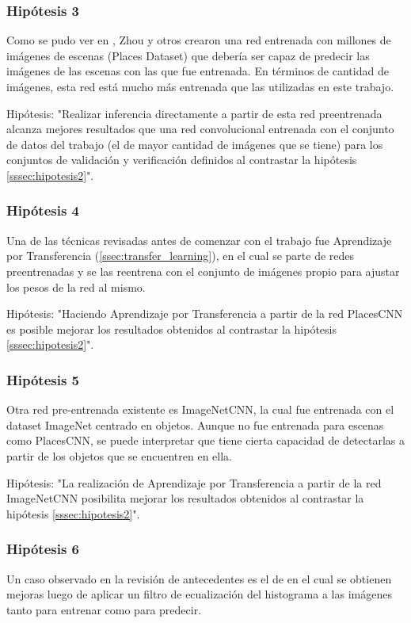 \subsubsection{Hipótesis 3} \label{sssec:hipotesis3}
Como se pudo ver en \cite{learning_deep_features}, Zhou y otros crearon una red entrenada con millones de imágenes de escenas (Places Dataset) que debería ser capaz de predecir las imágenes de las escenas con las que fue entrenada. En términos de cantidad de imágenes, esta red está mucho más entrenada que las utilizadas en este trabajo. 

Hipótesis: "Realizar inferencia directamente a partir de esta red preentrenada alcanza mejores resultados que una red convolucional entrenada con el conjunto de datos del trabajo \cite{vision_based_real_estate_price_estimation} (el de mayor cantidad de imágenes que se tiene) para los conjuntos de validación y verificación definidos al contrastar la hipótesis \ref{sssec:hipotesis2}".

\subsubsection{Hipótesis 4} \label{sssec:hipotesis4}
Una de las técnicas revisadas antes de comenzar con el trabajo fue Aprendizaje por Transferencia (\ref{ssec:transfer_learning}), en el cual se parte de redes preentrenadas y se las reentrena con el conjunto de imágenes propio para ajustar los pesos de la red al mismo. 

Hipótesis: "Haciendo Aprendizaje por Transferencia a partir de la red PlacesCNN es posible mejorar los resultados obtenidos al contrastar la hipótesis \ref{sssec:hipotesis2}".


\subsubsection{Hipótesis 5} \label{sssec:hipotesis5}
Otra red pre-entrenada existente es ImageNetCNN, la cual fue entrenada con el dataset ImageNet centrado en objetos. Aunque no fue entrenada para escenas como PlacesCNN, se puede interpretar que tiene cierta capacidad de detectarlas a partir de los objetos que se encuentren en ella. 

Hipótesis: "La realización de Aprendizaje por Transferencia a partir de la red ImageNetCNN posibilita mejorar los resultados obtenidos al contrastar la hipótesis \ref{sssec:hipotesis2}".

\subsubsection{Hipótesis 6} \label{sssec:hipotesis6}
Un caso observado en la revisión de antecedentes es el de \cite{lstm_real_estate} en el cual se obtienen mejoras luego de aplicar un filtro de ecualización del histograma a las imágenes tanto para entrenar como para predecir. 

